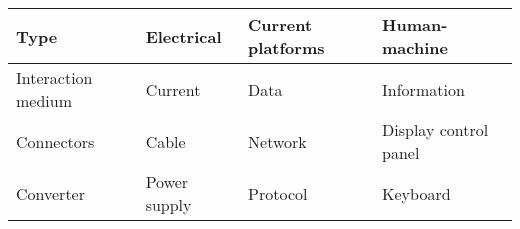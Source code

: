 \begin{tabular}{l l l l}
    \hline
    \textbf{Type} & \textbf{Electrical} & \textbf{Current platforms} & \textbf{Human-machine} \\
    \hline
    Interaction medium & Current & Data & Information \\
    Connectors & Cable & Network & Display control panel \\
    Converter & Power supply & Protocol & Keyboard \\    
\end{tabular}